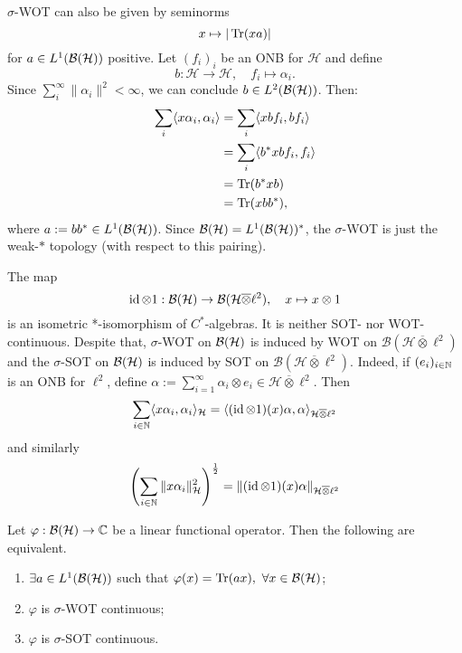 \begin{remark}
  $\sigma$-WOT can also be given by seminorms 
  $$x \mapsto |\operatorname{Tr} (xa) |$$
  for $a \in L^1 (\operatorname{\mathcal{B} (\mathcal{H})})$ positive.
  Let $(f_i)_i$ be an ONB for $\mathcal{H}$ and define 
  $$b: \mathcal{H} \to \mathcal{H},\quad f_i \mapsto \alpha_i.$$
  Since $\sum_i ^\infty \| \alpha_i \|^2 < \infty$, we can conclude $b \in L^2 (\operatorname{\mathcal{B} (\mathcal{H})})$.
  Then:
  \begin{align*}
    \sum_i \langle x \alpha_i, \alpha_i \rangle &= \sum_i \langle xb f_i, b f_i\rangle\\
    &= \sum_i \langle b^* x bf_i, f_i\rangle\\
    &= \operatorname{Tr} (b^* xb)\\
    &= \operatorname{Tr} (xbb^*),
  \end{align*}
  where $a := b b^* \in L^1 (\operatorname{\mathcal{B} (\mathcal{H})})$. Since $\operatorname{\mathcal{B} (\mathcal{H})} = L^1 (\mathcal{B} (\mathcal{H}))^*$,
  the $\sigma$-WOT is just the weak-$*$ topology (with respect to this pairing).
\end{remark}

\begin{remark}
  The map 
  $$\operatorname{id} \otimes 1: \operatorname{\mathcal{B} (\mathcal{H})} \to \mathcal{B} (\mathcal{H} \overline{\otimes} \ell^2),\quad x \mapsto x \otimes 1$$
  is an isometric *-isomorphism of $C^*$-algebras. It is neither SOT- nor WOT-continuous.
  Despite that, $\sigma$-WOT on $\operatorname{\mathcal{B} (\mathcal{H})}$ is induced by WOT on $\mathcal{B} (\mathcal{H} \overline{\otimes} \ell^2)$ 
  and the $\sigma$-SOT on $\operatorname{\mathcal{B} (\mathcal{H})}$ is induced by SOT on $\mathcal{B} (\mathcal{H} \overline{\otimes} \ell^2)$. 
  Indeed, if $(e_i)_{i \in \mathbb {N}}$ is an ONB for $\ell^2$, define $\alpha := \sum_{i = 1} ^\infty \alpha_i \otimes e_i \in \mathcal{H} \overline{\otimes} \ell^2$.
  Then 
  $$\sum_{i \in \mathbb {N}} \langle x \alpha_i, \alpha_i \rangle_{\mathcal{H}} = \langle (\operatorname{id} \otimes 1)(x) \alpha, \alpha \rangle_{\mathcal{H} \overline{\otimes} \ell^2}$$ 
  and similarly $$\left(\sum_{i \in \mathbb {N}}  \| x \alpha_i \|^2 _{\mathcal{H}}\right)^{\frac{1}{2}} = \| (\operatorname{id} \otimes 1)(x) \alpha \|_{\mathcal{H} \overline{\otimes} \ell^2}$$ 
\end{remark}

\begin{lemma}
  Let $\varphi: \operatorname{\mathcal{B} (\mathcal{H})} \to \mathbb {C}$ be a linear functional operator. Then the following are equivalent.
  \begin{enumerate}
    \item $\exists a \in L^1 (\operatorname{\mathcal{B} (\mathcal{H})})$ such that $\varphi(x) = \operatorname{Tr} (a x),\ \forall x \in \operatorname{\mathcal{B} (\mathcal{H})}$;
    \item $\varphi$ is $\sigma$-WOT continuous;
    \item $\varphi$ is $\sigma$-SOT continuous.
  \end{enumerate}
\end{lemma}

